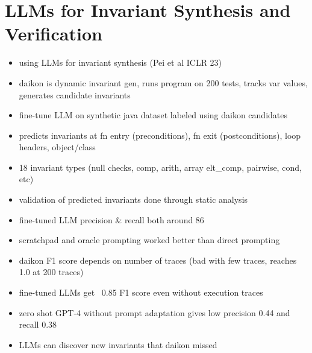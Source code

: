 \documentclass[11pt]{book}
\begin{document}
\setcounter{chapter}{3}
\chapter{LLMs for Invariant Synthesis and Verification}

\begin{itemize}
\item using LLMs for invariant synthesis (Pei et al ICLR 23)
\item daikon is dynamic invariant gen, runs program on 200 tests, tracks var values, generates candidate invariants
\item fine-tune LLM on synthetic java dataset labeled using daikon candidates
\item predicts invariants at fn entry (preconditions), fn exit (postconditions), loop headers, object/class
\item 18 invariant types (null checks, comp, arith, array elt_comp, pairwise, cond, etc)
\item validation of predicted invariants done through static analysis
\item fine-tuned LLM precision & recall both around 86%
\item scratchpad and oracle prompting worked better than direct prompting
\item daikon F1 score depends on number of traces (bad with few traces, reaches 1.0 at 200 traces)
\item fine-tuned LLMs get ~0.85 F1 score even without execution traces
\item zero shot GPT-4 without prompt adaptation gives low precision 0.44 and recall 0.38
\item LLMs can discover new invariants that daikon missed


\end{itemize}
\end{document}
